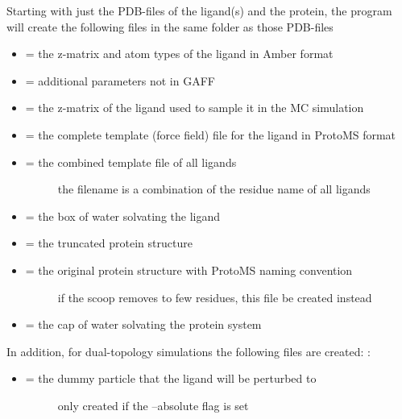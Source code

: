 \documentclass[letterpaper,10pt,english]{sphinxmanual}
\begin{document}
Starting with just the PDB-files of the ligand(s) and the protein, the program will create the following files in the same folder as those PDB-files
\begin{itemize}
\item {} 
 = the z-matrix and atom types of the ligand in Amber format

\item {} 
 = additional parameters not in GAFF

\item {} 
 = the z-matrix of the ligand used to sample it in the MC simulation

\item {} 
 = the complete template (force field) file for the ligand in ProtoMS format

\item {} \begin{description}
\item[{ = the combined template file of all ligands}] \leavevmode
the filename is a combination of the residue name of all ligands

\end{description}

\item {} 
 = the box of water solvating the ligand

\item {} 
 = the truncated protein structure

\item {} \begin{description}
\item[{ = the original protein structure with ProtoMS naming convention}] \leavevmode
if the scoop removes to few residues, this file be created instead

\end{description}

\item {} 
 = the cap of water solvating the protein system

\end{itemize}

In addition, for dual-topology simulations the following files are created: :
\begin{itemize}
\item {} \begin{description}
\item[{ = the dummy particle that the ligand will be perturbed to}] \leavevmode
only created if the --absolute flag is set

\end{description}

\end{itemize}
\end{document}
